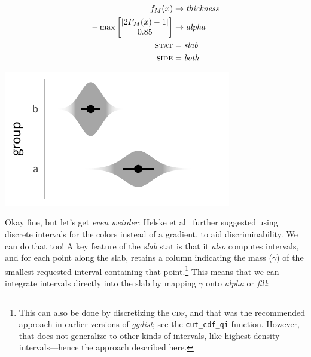 \documentclass[journal]{vgtc}                     %
\begin{document}
 \noindent
\begin{minipage}{.5\columnwidth}

\begin{align*}
f_M(x) &\rightarrow \textit{thickness}\\
-\max \left[ \begin{matrix} \lvert 2 F_M(x) - 1 \rvert \\ 0.85 \end{matrix} \right] &\rightarrow \textit{alpha}\\
\textsc{stat} &= \mathit{slab}\\
\textsc{side} &= \mathit{both}
\end{align*}
\end{minipage}%
  \begin{minipage}{.4\columnwidth}
    \centering
    \includegraphics[width=1.2\columnwidth]{figs/3-slab_violin_gradient.pdf}
  \end{minipage}
\hfill\break

Okay fine, but let's get \textit{even weirder}: Helske et al~\cite{helske2021can} further suggested using discrete intervals for the colors instead of a gradient, to aid discriminability. We can do that too! A key feature of the \textit{slab} stat is that it \textit{also} computes intervals, and for each point along the slab, retains a column indicating the mass ($\gamma$) of the smallest requested interval containing that point.\footnote{This can also be done by discretizing the \textsc{cdf}, and that was the recommended approach in earlier versions of \textit{ggdist}; see the \href{https://mjskay.github.io/ggdist/reference/cut_cdf_qi.html}{\texttt{cut\_cdf\_qi} function}. However, that does not generalize to other kinds of intervals, like highest-density intervals---hence the approach described here.}  This means that we can integrate intervals directly into the slab by mapping $\gamma$ onto \textit{alpha} or \textit{fill}:
\end{document}
